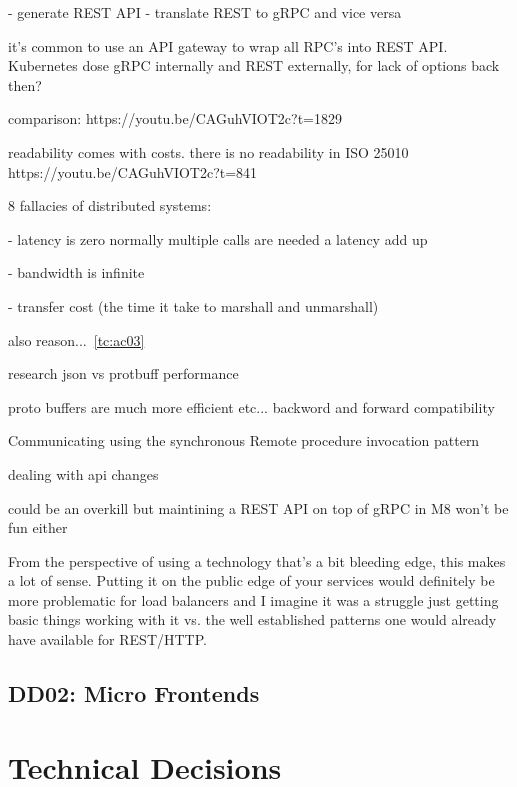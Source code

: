 - generate REST API
- translate REST to gRPC and vice versa


it’s common to use an API gateway to wrap all RPC’s into REST API. Kubernetes dose gRPC internally and REST externally, for lack of options back then?


comparison: https://youtu.be/CAGuhVIOT2c?t=1829


readability comes with costs. there is no readability in ISO 25010
https://youtu.be/CAGuhVIOT2c?t=841

8 fallacies of distributed systems:

- latency is zero
normally multiple calls are needed a latency add up

- bandwidth is infinite

- transfer cost (the time it take to marshall and unmarshall)

also reason...~\ref{tc:ac03}

research json vs protbuff performance


proto buffers are much more efficient etc...
backword and forward compatibility

Communicating using the synchronous Remote
procedure invocation pattern \citep{richardson2018microservices}

dealing with api changes





could be an overkill but maintining a REST API on top of gRPC in M8 won't be fun either

From the perspective of using a technology that's a bit bleeding edge, this makes a lot of sense. Putting it on the public edge of your services would definitely be more problematic for load balancers and I imagine it was a struggle just getting basic things working with it vs. the well established patterns one would already have available for REST/HTTP.

\subsection{DD02: Micro Frontends}

\section{Technical Decisions}


